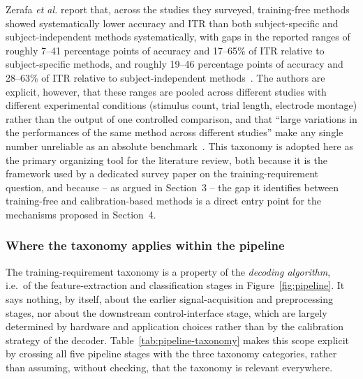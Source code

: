 \documentclass[11pt]{article}
\begin{document}
Zerafa \textit{et al.} report that, across the studies they surveyed, training-free methods showed systematically lower accuracy and ITR than both subject-specific and subject-independent methods systematically, with gaps in the reported ranges of roughly 7--41 percentage points of accuracy and 17--65\% of ITR relative to subject-specific methods, and roughly 19--46 percentage points of accuracy and 28--63\% of ITR relative to subject-independent methods~\cite{zerafa2018train}. The authors are explicit, however, that these ranges are pooled across different studies with different experimental conditions (stimulus count, trial length, electrode montage) rather than the output of one controlled comparison, and that ``large variations in the performances of the same method across different studies'' make any single number unreliable as an absolute benchmark~\cite{zerafa2018train}. This taxonomy is adopted here as the primary organizing tool for the literature review, both because it is the framework used by a dedicated survey paper on the training-requirement question, and because -- as argued in Section~3 -- the gap it identifies between training-free and calibration-based methods is a direct entry point for the mechanisms proposed in Section~4.

\subsubsection{Where the taxonomy applies within the pipeline}

The training-requirement taxonomy is a property of the \emph{decoding algorithm}, i.e.\ of the feature-extraction and classification stages in Figure~\ref{fig:pipeline}. It says nothing, by itself, about the earlier signal-acquisition and preprocessing stages, nor about the downstream control-interface stage, which are largely determined by hardware and application choices rather than by the calibration strategy of the decoder. Table~\ref{tab:pipeline-taxonomy} makes this scope explicit by crossing all five pipeline stages with the three taxonomy categories, rather than assuming, without checking, that the taxonomy is relevant everywhere.
\end{document}

